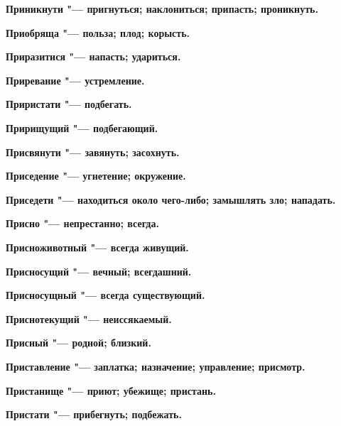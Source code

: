 \begin{mymulticols}{2}
\bfseries Приникнути\normalfont{} "--- пригнуться; наклониться; припасть; проникнуть. 




\bfseries Приобряща\normalfont{} "--- польза; плод; корысть. 




\bfseries Приразитися\normalfont{} "--- напасть; удариться. 




\bfseries Приревание\normalfont{} "--- устремление. 




\bfseries Приристати\normalfont{} "--- подбегать. 




\bfseries Пририщущий\normalfont{} "--- подбегающий. 




\bfseries Присвянути\normalfont{} "--- завянуть; засохнуть. 




\bfseries Приседение\normalfont{} "--- угнетение; окружение. 




\bfseries Приседети\normalfont{} "--- находиться около чего-либо; замышлять зло; нападать. 




\bfseries Присно\normalfont{} "--- непрестанно; всегда. 




\bfseries Присноживотный\normalfont{} "--- всегда живущий. 




\bfseries Присносущий\normalfont{} "--- вечный; всегдашний. 




\bfseries Присносущный\normalfont{} "--- всегда существующий. 




\bfseries Приснотекущий\normalfont{} "--- неиссякаемый. 




\bfseries Присный\normalfont{} "--- родной; близкий. 




\bfseries Приставление\normalfont{} "--- заплатка; назначение; управление; присмотр. 




\bfseries Пристанище\normalfont{} "--- приют; убежище; пристань. 




\bfseries Пристати\normalfont{} "--- прибегнуть; подбежать. 





\end{mymulticols}
